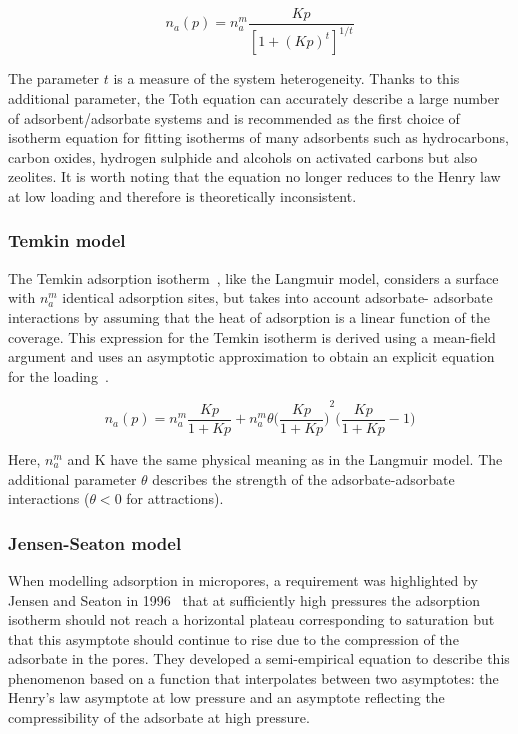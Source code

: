 \begin{equation}\label{pyg:eqn:toth}
	n_a(p) = n_a^m \frac{K p}{{[1 + {(K p)}^t]}^{1/t}}
\end{equation}

The parameter \(t\) is a measure of the system heterogeneity. Thanks
to this
additional parameter, the Toth equation can accurately describe a
large number of adsorbent/adsorbate systems and is recommended as the
first
choice of isotherm equation for fitting isotherms of many adsorbents
such as
hydrocarbons, carbon oxides, hydrogen sulphide and alcohols on
activated carbons
but also zeolites.
It is worth noting that the equation no longer reduces to the Henry
law
at low loading and therefore is theoretically inconsistent.

\subsubsection{Temkin model}\label{pyg:models:temkin}

The Temkin adsorption
isotherm~\cite{temkinKineticsAmmoniaSynthesis1940},
like the Langmuir model, considers
a surface with \(n_a^m\) identical adsorption sites, but takes into
account adsorbate-
adsorbate interactions by assuming that the heat of adsorption is a
linear
function of the coverage. This expression for the Temkin isotherm is
derived
using a mean-field argument and uses an asymptotic approximation
to obtain an explicit equation for the
loading~\cite{simonOptimizingNanoporousMaterials2014}.

\begin{equation}\label{pyg:eqn:temkin}
	n_a(p) = n_a^m \frac{Kp}{1+Kp} + n_a^m \theta
	{\Big(\frac{Kp}{1+Kp}\Big)}^2 \Big(\frac{Kp}{1+Kp} -1\Big)
\end{equation}

Here, \(n_a^m\) and K have the same physical meaning as in the
Langmuir model.
The additional parameter \(\theta\) describes the strength of the
adsorbate-adsorbate
interactions (\(\theta < 0\) for attractions).

\subsubsection{Jensen-Seaton model}\label{pyg:models:jseaton}

When modelling adsorption in micropores, a requirement was
highlighted by
Jensen and Seaton in 1996~\cite{jensenIsothermEquationAdsorption1996}
that at sufficiently high pressures the adsorption
isotherm should not reach a horizontal plateau corresponding to
saturation but
that this asymptote should continue to rise due to the compression
of the adsorbate in the pores. They developed a semi-empirical
equation
to describe this phenomenon based on a function that interpolates
between
two asymptotes: the Henry’s law asymptote at low pressure and an
asymptote reflecting the compressibility of the adsorbate at
high pressure.

